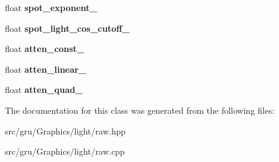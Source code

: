\begin{DoxyCompactItemize}
\item 
\hypertarget{classglutpp_1_1light_1_1raw_adc838bbb511b1804b854f72238c98088}{float {\bfseries spot\-\_\-exponent\-\_\-}}\label{classglutpp_1_1light_1_1raw_adc838bbb511b1804b854f72238c98088}

\item 
\hypertarget{classglutpp_1_1light_1_1raw_a95ff4f47036d288753adf1af64eb2b96}{float {\bfseries spot\-\_\-light\-\_\-cos\-\_\-cutoff\-\_\-}}\label{classglutpp_1_1light_1_1raw_a95ff4f47036d288753adf1af64eb2b96}

\item 
\hypertarget{classglutpp_1_1light_1_1raw_a11158655fbf3292e6c63aa127e5b1b93}{float {\bfseries atten\-\_\-const\-\_\-}}\label{classglutpp_1_1light_1_1raw_a11158655fbf3292e6c63aa127e5b1b93}

\item 
\hypertarget{classglutpp_1_1light_1_1raw_aa4b209c2c061da557e02c996ebb052a3}{float {\bfseries atten\-\_\-linear\-\_\-}}\label{classglutpp_1_1light_1_1raw_aa4b209c2c061da557e02c996ebb052a3}

\item 
\hypertarget{classglutpp_1_1light_1_1raw_ae86cc622a59f30f2ec79fe342e3597a7}{float {\bfseries atten\-\_\-quad\-\_\-}}\label{classglutpp_1_1light_1_1raw_ae86cc622a59f30f2ec79fe342e3597a7}

\end{DoxyCompactItemize}


\-The documentation for this class was generated from the following files\-:\begin{DoxyCompactItemize}
\item 
src/gru/\-Graphics/light/raw.\-hpp\item 
src/gru/\-Graphics/light/raw.\-cpp\end{DoxyCompactItemize}
